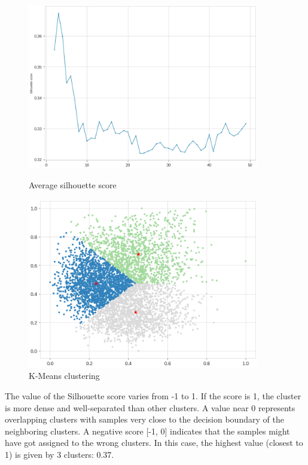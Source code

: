 \documentclass[a4paper,11pt,dvipsnames]{article}
\begin{document}
\begin{figure}[h]
    \centering

\begin{minipage}{0.49\textwidth}
    \centering
    \includegraphics[width=0.9\textwidth]{Graphs/Average silhouette score.png}
    \caption{Average silhouette score}
    \label{fig:Average silhouette score}
\end{minipage}
\hfil
\begin{minipage}{0.5\textwidth}
\centering
    \includegraphics[width=0.9\textwidth]{Graphs/K-Means.png}
    \caption{K-Means clustering}
    \label{fig:K-Means}
\end{minipage}
\end{figure}

The value of the Silhouette score varies from -1 to 1. If the score is 1, the cluster is more dense and well-separated than other clusters. A value near 0 represents overlapping clusters with samples very close to the decision boundary of the neighboring clusters. A negative score [-1, 0] indicates that the samples might have got assigned to the wrong clusters. In this case, the highest value (closest to 1) is given by 3 clusters: 0.37.
\end{document}
